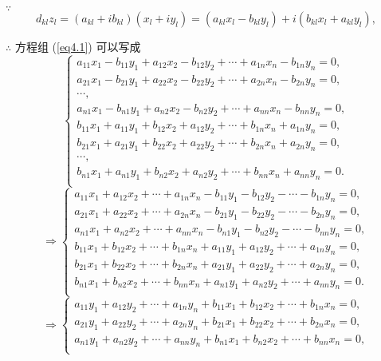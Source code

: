 \documentclass[color=black,device=normal,lang=cn,mode=geye]{elegantnote}
\begin{document}
\begin{solution}
    $\because$
    \[d_{kl}z_l=(a_{kl}+ib_{kl})(x_l+iy_l)=(a_{kl}x_l-b_{kl}y_l)+i(b_{kl}x_l+a_{kl}y_l),\]

    $\therefore$ 方程组 (\ref{eq4.1}) 可以写成
    \[\begin{cases}
        a_{11}x_1-b_{11}y_1+a_{12}x_2-b_{12}y_2+\cdots+a_{1n}x_n-b_{1n}y_n=0, \\
        a_{21}x_1-b_{21}y_1+a_{22}x_2-b_{22}y_2+\cdots+a_{2n}x_n-b_{2n}y_n=0, \\
        \cdots, \\
        a_{n1}x_1-b_{n1}y_1+a_{n2}x_2-b_{n2}y_2+\cdots+a_{nn}x_n-b_{nn}y_n=0, \\
        b_{11}x_1+a_{11}y_1+b_{12}x_2+a_{12}y_2+\cdots+b_{1n}x_n+a_{1n}y_n=0, \\
        b_{21}x_1+a_{21}y_1+b_{22}x_2+a_{22}y_2+\cdots+b_{2n}x_n+a_{2n}y_n=0, \\
        \cdots, \\
        b_{n1}x_1+a_{n1}y_1+b_{n2}x_2+a_{n2}y_2+\cdots+b_{nn}x_n+a_{nn}y_n=0. \\
    \end{cases}\]
    \[\Rightarrow\begin{cases}
        a_{11}x_1+a_{12}x_2+\cdots+a_{1n}x_n-b_{11}y_1-b_{12}y_2-\cdots-b_{1n}y_n=0, \\
        a_{21}x_1+a_{22}x_2+\cdots+a_{2n}x_n-b_{21}y_1-b_{22}y_2-\cdots-b_{2n}y_n=0, \\
        a_{n1}x_1+a_{n2}x_2+\cdots+a_{nn}x_n-b_{n1}y_1-b_{n2}y_2-\cdots-b_{nn}y_n=0, \\
        b_{11}x_1+b_{12}x_2+\cdots+b_{1n}x_n+a_{11}y_1+a_{12}y_2+\cdots+a_{1n}y_n=0, \\
        b_{21}x_1+b_{22}x_2+\cdots+b_{2n}x_n+a_{21}y_1+a_{22}y_2+\cdots+a_{2n}y_n=0, \\
        b_{n1}x_1+b_{n2}x_2+\cdots+b_{nn}x_n+a_{n1}y_1+a_{n2}y_2+\cdots+a_{nn}y_n=0. \\
    \end{cases}\]
    \begin{equation}\label{eq4.2}
        \Rightarrow\begin{cases}
            a_{11}y_1+a_{12}y_2+\cdots+a_{1n}y_n+b_{11}x_1+b_{12}x_2+\cdots+b_{1n}x_n=0,  \\
            a_{21}y_1+a_{22}y_2+\cdots+a_{2n}y_n+b_{21}x_1+b_{22}x_2+\cdots+b_{2n}x_n=0,  \\
            a_{n1}y_1+a_{n2}y_2+\cdots+a_{nn}y_n+b_{n1}x_1+b_{n2}x_2+\cdots+b_{nn}x_n=0,  \\

\end{cases}
\end{equation}
\end{solution}
\end{document}
